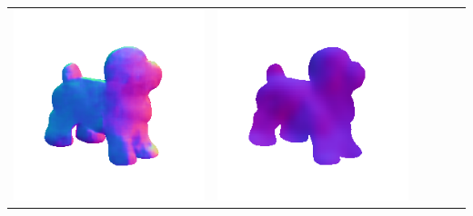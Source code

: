 \begin{center}
\begin{tabularx}{\linewidth}{@{}Y@{}Y@{}Y@{}Y@{}Y@{}Y@{}}
\includegraphics[width=\linewidth]{semisynthetic/20160617_17_marrnet_out.png} &
\includegraphics[width=\linewidth]{semisynthetic/20160617_17_ef_out.png} \\

\end{tabularx}
\end{center}

